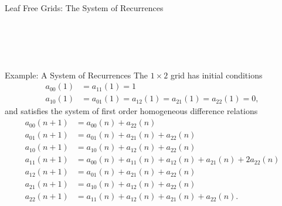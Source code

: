 \documentclass{beamer}%
\newcommand\indxx[2]{#1#2}
\newcommand\indxxx[2]{\genfrac{}{}{0pt}{0}{#1}{#2}}
\begin{document}
\begin{frame}{Leaf Free Grids: The System of Recurrences}
\begin{columns}
\begin{column}{0.5\textwidth}
      \\~\\
    \end{column}
  \end{columns}
\end{frame}

\begin{frame}{Example: A System of Recurrences}
  The $1 \times 2$ grid has initial conditions
  \begin{align*}
    a_{\indxx 00}(1) &= a_{\indxx 11}(1) = 1 \\
    a_{\indxx 10}(1) &= a_{\indxx 01}(1) = a_{\indxx 12}(1) = a_{\indxx 21}(1) = a_{\indxx 22}(1) = 0,
  \end{align*}
  and satisfies the system of first order homogeneous difference relations
  \begin{align*}
    a_{\indxx 00}(n + 1) &= a_{\indxx 00}(n) + a_{\indxx 22}(n) \\
    a_{\indxx 01}(n + 1) &= a_{\indxx 01}(n) + a_{\indxx 21}(n) + a_{\indxx 22}(n) \\
    a_{\indxx 10}(n + 1) &= a_{\indxx 10}(n) + a_{\indxx 12}(n) + a_{\indxx 22}(n) \\
    a_{\indxx 11}(n + 1) &= a_{\indxx 00}(n) + a_{\indxx 11}(n) + a_{\indxx 12}(n)
                      + a_{\indxx 21}(n) + 2a_{\indxx 22}(n) \\
    a_{\indxx 12}(n + 1) &= a_{\indxx 01}(n) + a_{\indxx 21}(n) + a_{\indxx 22}(n) \\
    a_{\indxx 21}(n + 1) &= a_{\indxx 10}(n) + a_{\indxx 12}(n) + a_{\indxx 22}(n) \\
    a_{\indxx 22}(n + 1) &= a_{\indxx 11}(n) + a_{\indxx 12}(n) + a_{\indxx 21}(n) + a_{\indxx 22}(n).
  \end{align*}
\end{frame}
\end{document}
